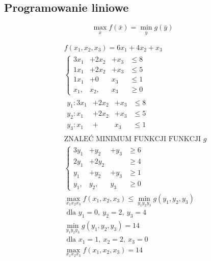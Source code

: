\subsection{Programowanie liniowe}
\begin{definition}
$$\max _{\bar{x}}f(\bar{x})=\min _{\bar{y}}g(\bar{y})$$
\end{definition}
\begin{problem*}
\begin{align*}
&f(x_1,x_2,x_3)=6x_1+4x_2+x_3\\
&\left\{\begin{matrix}
3x_1 &+	2x_2 &+	x_3 &\leq 8\\
1x_1 &+	2x_2 &+	x_3 &\leq 5\\
1x_1 &+	0 &		x_3 &\leq 1\\
x_1, &	x_2, &	x_3	&\geq 0
\end{matrix}\right.\\
&\begin{matrix}
y_1:3x_1 &+	2x_2 &+	x_3 &\leq 8\\
y_2:x_1 &+	2x_2 &+ x_3 &\leq 5\\
y_3:x_1 &+		 &  x_3 &\leq 1
\end{matrix}\\
&\text{ZNALEĆ MINIMUM FUNKCJI FUNKCJI }g\\
&\left\{
\begin{matrix}
3y_1	&+ y_2	&+ y_3	&\geq 6\\
2y_1	&+ 2y_2	&& \geq 4\\
y_1		&+ y_2	&+ y_3	&\geq 1\\
y_1,	& y_2,	& y_3	&\geq 0
\end{matrix}
\right.\\
&\max _{x_1x_2x_3} f(x_1,x_2,x_3)\leq \min _{y_1y_2y_3} g(y_1,y_2,y_3)\\
&\text{ dla }y_1=0,\ y_2=2,\ y_3=4\\
&\min _{y_1y_2y_3} g(y_1,y_2,y_3)=14\\
&\text{ dla }x_1=1,\ x_2=2,\ x_3=0\\
&\max _{x_1x_2x_3} f(x_1,x_2,x_3)=14
\end{align*}
\end{problem*}

